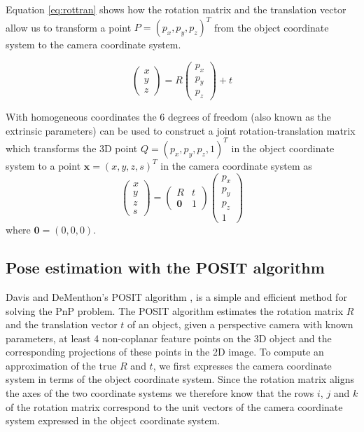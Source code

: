 \documentclass[11pt,a4paper,twoside]{report}
\begin{document}
Equation \ref{eq:rottran} shows how the rotation matrix and the translation vector allow us to transform a point $P
= (p_x,p_y,p_z)^T$
from the object coordinate system to the camera coordinate system. 

\begin{equation}\label{eq:rottran}
\begin{pmatrix}x\\y\\z\end{pmatrix} =
  R\begin{pmatrix}p_x\\p_y\\p_z\end{pmatrix} + t
\end{equation}

With homogeneous coordinates the 6 degrees of freedom (also known as the
extrinsic parameters) can be used to
construct a joint rotation-translation matrix which transforms the 3D point
$Q = (p_x,p_y,p_z,1)^T$ in the object coordinate system to a point $\mathbf{x}
= (x,y,z,s)^T$ in the camera coordinate system as
\begin{equation}\label{eq:jointrottran}
\begin{pmatrix}x\\y\\z\\s\end{pmatrix} =
  \begin{pmatrix}R&t\\\mathbf{0}&1\end{pmatrix}\begin{pmatrix}p_x\\p_y\\p_z\\1\end{pmatrix}
\end{equation}
where $\mathbf{0} = (0,0,0)$. 


\subsection{Pose estimation with the POSIT algorithm}\label{posit}
Davis and DeMenthon's POSIT algorithm \cite{POSIT}, \cite{opencv} is a simple and efficient method for solving the PnP
problem. The POSIT algorithm estimates the rotation matrix $R$ and the
translation vector $t$
of an object, given a perspective camera with known parameters, at least 4 non-coplanar feature points on the 3D object and the corresponding
projections of these points in the 2D image. To compute an approximation of the
true $R$ and $t$, we first expresses the camera coordinate system in terms of
the object coordinate system. Since the rotation matrix aligns the axes of the
two coordinate systems we therefore know that the rows $i$, $j$ and $k$ of the
rotation matrix correspond to the unit vectors of the camera coordinate
system expressed in the object coordinate system. 
\end{document}
